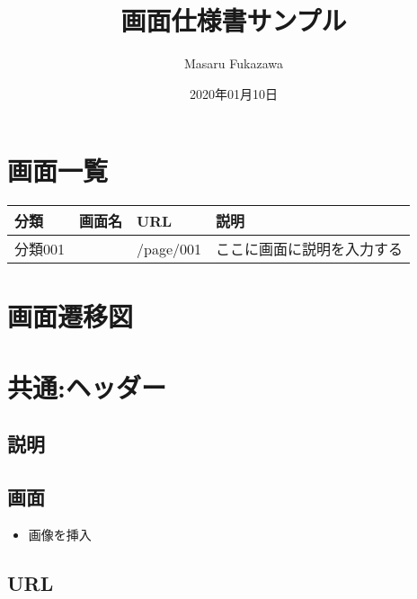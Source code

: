\documentclass[letterpaper,10pt,dvipdfmx]{sphinxmanual}
\title{画面仕様書サンプル}
\date{2020年01月10日}
\author{Masaru Fukazawa}
\begin{document}
\pagestyle{empty}
\sphinxmaketitle
\pagestyle{plain}
\sphinxtableofcontents
\pagestyle{normal}
\label{\detokenize{index::doc}}



\chapter{画面一覧}
\label{\detokenize{screen_list:id1}}\label{\detokenize{screen_list::doc}}

\begin{savenotes}\sphinxattablestart
\centering
\begin{tabulary}{\linewidth}[t]{|T|T|T|T|}
\hline
\sphinxstyletheadfamily 
分類
&\sphinxstyletheadfamily 
画面名
&\sphinxstyletheadfamily 
URL
&\sphinxstyletheadfamily 
説明
\\
\hline
分類001
&
{\hyperref[\detokenize{page_001::doc}]{}}
&
/page/001
&
ここに画面に説明を入力する
\\
\hline
\end{tabulary}
\par
\sphinxattableend\end{savenotes}


\chapter{画面遷移図}
\label{\detokenize{screen_transition_diagram:id1}}\label{\detokenize{screen_transition_diagram::doc}}

\chapter{共通:ヘッダー}
\label{\detokenize{header:id1}}\label{\detokenize{header::doc}}

\section{説明}
\label{\detokenize{header:id2}}

\section{画面}
\label{\detokenize{header:id3}}\begin{itemize}
\item {} 
画像を挿入

\end{itemize}


\section{URL}
\label{\detokenize{header:url}}
\end{document}

